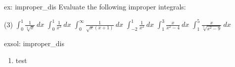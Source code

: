 \begin{ex}[]{ex: improper_dis}
    Evaluate the following improper integrals:
    \begin{tasks}(3)
        \task $\int_0^1 \frac{1}{\sqrt[3]{x}}~dx$
        \task $\int_0^1 \frac{1}{x^3}~dx$
        \task $\int_{0}^{\infty} \frac{1}{\sqrt{x}(x+1)}~dx$
        \task $\int_{-2}^1 \frac{1}{x^2}~dx$
        \task $\int_1^3 \frac{x}{x^2-4}~dx$
        \task $\int_1^5 \frac{x}{\sqrt[3]{x^2-9}}~dx$
    \end{tasks}
\end{ex}

\begin{exsol}[]{exsol: improper_dis}
    \begin{enumerate}
        \item test
    \end{enumerate}
\end{exsol}